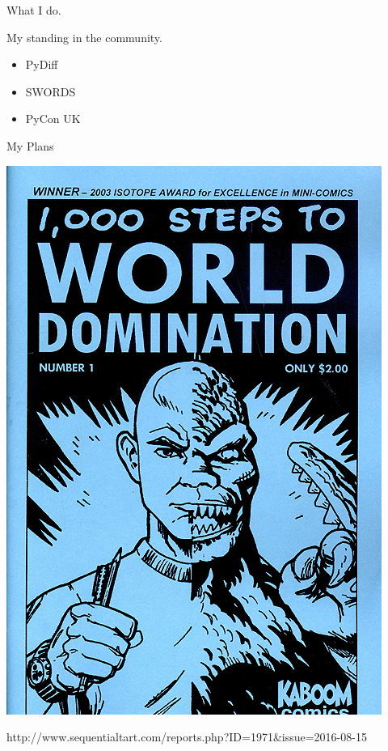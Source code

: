 \documentclass{beamer}
\begin{document}
\begin{frame}{What I do.}
\def\labellist{{" ","(1980)","(1991)","(1992)","(2012)"," ","(2015)"," "}}
\end{frame}

\begin{frame}{My standing in the community.}
\center
        \begin{itemize}
        \item PyDiff %
        \item SWORDS
        \item PyCon UK
        \end{itemize}
\end{frame}

\begin{frame}{My Plans}
	\begin{center}
		\includegraphics[width=.40\textwidth]{static/evil-mastermind.png}
	\end{center}

\hfill \tiny http://www.sequentialtart.com/reports.php?ID=1971\&issue=2016-08-15

\end{frame}
\end{document}
